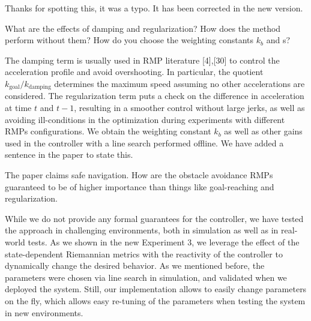\documentclass[a4paper,11pt]{article}
\begin{document}
Thanks for spotting this, it was a typo. It has been corrected in the new 
version.

\begin{displayquote}
	What are the effects of damping and regularization? How does the method
	perform without them? How do you choose the weighting constants $k_b$ and 	
	s?
\end{displayquote}

\begin{outline}[enumerate]
	\1 The damping term is usually used in RMP literature [4],[30] to control 
	the 
	acceleration profile and avoid overshooting. In particular, the quotient 
	$k_{\text{goal}} / k_{\text{damping}}$ determines the maximum speed 
	assuming no other accelerations are considered.
	\1 The regularization term puts a check on the difference in acceleration 
	at time $t$ and $t-1$, resulting in a smoother control without large jerks, 
	as well as avoiding ill-conditions in the optimization during experiments 
	with different RMPs configurations.
	\1 We obtain the weighting constant $k_b$ as well as other gains used in 
	the controller with a line search performed offline. We have added a 
	sentence in the paper to state this.
\end{outline}

\begin{displayquote}
	The paper claims safe navigation. How are the obstacle avoidance RMPs
	guaranteed to be of higher importance than things like goal-reaching
	and regularization.
\end{displayquote}

\begin{outline}[enumerate]
	\1 While we do not provide any formal guarantees for the controller, we 
	have tested the approach in challenging environments, both in simulation 
	as well as in real-world tests.
	\1 As we shown in the new Experiment 3, we leverage the effect of the 
	state-dependent Riemannian metrics with the reactivity of the controller to 
	dynamically change the desired behavior.
	\1 As we mentioned before, the parameters were chosen via line search in 
	simulation, and validated when we deployed the system.
	\1 Still, our implementation allows to easily change parameters on the fly, 
	which allows easy re-tuning of the parameters when testing the system in 
	new environments.
\end{outline}
\end{document}
